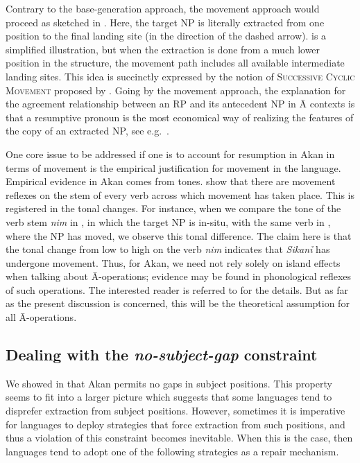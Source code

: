 \documentclass[output=paper]{LSP/langsci}
\begin{document}
Contrary to the base-generation approach, the movement approach would proceed as sketched in . Here, the target NP is literally extracted from one position to the final landing site (in the direction of the dashed arrow).  is a simplified illustration, but when the extraction is done from a much lower position in the structure, the movement path includes all available intermediate landing sites. This idea is succinctly expressed by the notion of \textsc{Successive Cyclic Movement} proposed by \cite{Chomsky77}. Going by the movement approach, the explanation for the agreement relationship between an RP and its antecedent NP in \=A contexts is that a resumptive pronoun is the most economical way of realizing the features of the copy of an extracted NP, see e.g.\ \cite{Nunes04}.
    
One core issue to be addressed  if one is to  account for resumption in Akan in terms of movement is the empirical justification for movement in the language. Empirical evidence in  Akan comes from tones. \cite{KorsahnMurphy15} show that there are movement reflexes on the stem of every verb across which movement has taken place. This is registered in the tonal changes. For instance, when we compare the tone of the verb  stem \textit{nim} in , in which the target NP is in-situ, with the same verb in , where the NP has moved, we observe this tonal difference. The claim here is that the tonal change from low to high on the verb \textit{nim} indicates that \textit{Sikan\h i} has undergone movement. Thus, for Akan, we need not rely solely on island effects when talking about \=A-operations; evidence may be found in phonological reflexes of such operations. The interested reader is referred to \cite{KorsahnMurphy15} for the details. But as far as the present discussion is concerned, this will be the theoretical assumption for all \=A-operations.
  
     
\subsection{Dealing with the \textit{no-subject-gap} constraint}\label{sec:korsah:2.3}

We showed in  that Akan permits no gaps in subject positions. This property seems to fit into a larger picture which suggests that some languages tend to disprefer extraction from subject positions. However, sometimes it is imperative for languages to deploy strategies that force extraction from such positions, and thus a violation of this constraint becomes inevitable. When this is the case, then languages tend to adopt one of the following strategies as a repair mechanism.
  
\end{document}
